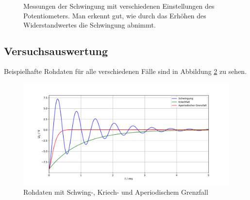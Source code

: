\documentclass[a4paper, 12pt]{scrartcl}
\begin{document}
\begin{figure}[h]
\centering
{}

\caption{Messungen der Schwingung mit verschiedenen Einstellungen des Potentiometers. Man erkennt gut, wie durch das Erhöhen des Widerstandwertes die Schwingung abnimmt.}
\label{pic:oszi}
\end{figure}

\subsection{Versuchsauswertung}

Beispielhafte Rohdaten für alle verschiedenen Fälle sind in Abbildung \ref{abb:rohdaten_ska} zu sehen.

\begin{figure}[H]
\centering
\includegraphics[width=.9\textwidth]{plots/rohdaten_ska.pdf}
\caption{Rohdaten mit Schwing-, Kriech- und Aperiodischem Grenzfall}
\label{abb:rohdaten_ska}
\end{figure}
\end{document}
